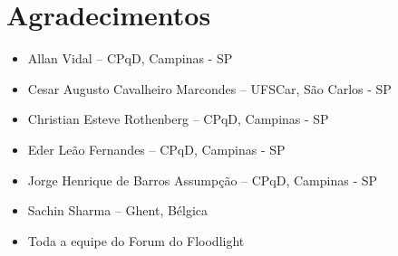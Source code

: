 \chapter{Agradecimentos}

\begin{itemize}
\item Allan Vidal -- CPqD, Campinas - SP
\item Cesar Augusto Cavalheiro Marcondes -- UFSCar, 
São Carlos - SP
\item Christian Esteve Rothenberg -- CPqD, Campinas - SP
\item Eder Leão Fernandes -- CPqD, Campinas - SP
\item Jorge Henrique de Barros Assumpção -- CPqD, Campinas - SP
\item Sachin Sharma -- Ghent, Bélgica
\item Toda a equipe do Forum do Floodlight
\end{itemize}
